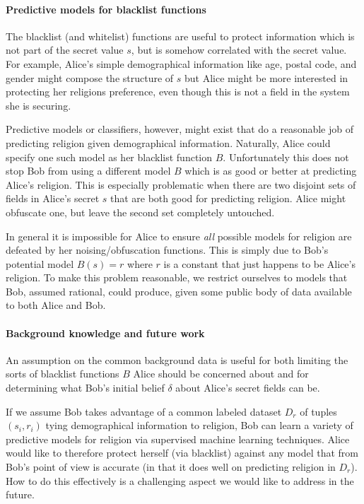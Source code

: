\documentclass{article} %
\newcommand{\rsecret}[0]{s}
\theoremstyle{plain} %
\theoremstyle{definition} %
\begin{document}
\paragraph*{Predictive models for blacklist functions} The blacklist
(and whitelist) functions are useful to protect information which is
not part of the secret value $ \rsecret $, but is somehow correlated
with the secret value. For example, Alice's simple demographical
information like age, postal code, and gender might compose the
structure of $ \rsecret $ but Alice might be more interested in
protecting her religions preference, even though this is not a field
in the system she is securing.

Predictive models or classifiers, however, might exist that do a
reasonable job of predicting religion given demographical
information. Naturally, Alice could specify one such model as her
blacklist function $ B $. Unfortunately this does not stop Bob from
using a different model $ B $ which is as good or better at predicting
Alice's religion. This is especially problematic when there are two
disjoint sets of fields in Alice's secret $ \rsecret $ that are both
good for predicting religion. Alice might obfuscate one, but leave the
second set completely untouched.

In general it is impossible for Alice to ensure \emph{all} possible
models for religion are defeated by her noising/obfuscation
functions. This is simply due to Bob's potential model $ B(s) = r $
where $ r $ is a constant that just happens to be Alice's religion. To
make this problem reasonable, we restrict ourselves to models that
Bob, assumed rational, could produce, given some public body of data
available to both Alice and Bob.

\paragraph*{Background knowledge and future work} An assumption on the common
background data is useful for both limiting the sorts of blacklist
functions $ B $ Alice should be concerned about and for determining
what Bob's initial belief $ \delta $ about Alice's secret fields can
be.

If we assume Bob takes advantage of a common labeled dataset $ D_r $
of tuples $ (s_i, r_i) $ tying demographical information to religion,
Bob can learn a variety of predictive models for religion via
supervised machine learning techniques. Alice would like to therefore
protect herself (via blacklist) against any model that from Bob's
point of view is accurate (in that it does well on predicting religion
in $ D_r $). How to do this effectively is a challenging aspect we
would like to address in the future.
\end{document}
